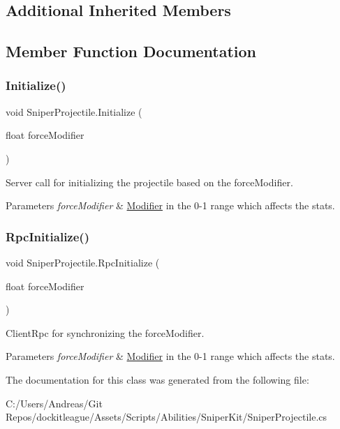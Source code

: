 \subsection*{Additional Inherited Members}


\subsection{Member Function Documentation}
\hypertarget{class_sniper_projectile_af684c23f2980a8cb1305acac888a0413}{}\label{class_sniper_projectile_af684c23f2980a8cb1305acac888a0413} 
\subsubsection{\texorpdfstring{Initialize()}{Initialize()}}
{\footnotesize\ttfamily void Sniper\+Projectile.\+Initialize (\begin{DoxyParamCaption}\item[{float}]{force\+Modifier }\end{DoxyParamCaption})}



Server call for initializing the projectile based on the force\+Modifier. 


\begin{DoxyParams}{Parameters}
{\em force\+Modifier} & \hyperlink{class_modifier}{Modifier} in the 0-\/1 range which affects the stats.\\
\hline
\end{DoxyParams}
\hypertarget{class_sniper_projectile_a0c84fa60ff4f788bb94f6c810ab59570}{}\label{class_sniper_projectile_a0c84fa60ff4f788bb94f6c810ab59570} 
\subsubsection{\texorpdfstring{Rpc\+Initialize()}{RpcInitialize()}}
{\footnotesize\ttfamily void Sniper\+Projectile.\+Rpc\+Initialize (\begin{DoxyParamCaption}\item[{float}]{force\+Modifier }\end{DoxyParamCaption})}



Client\+Rpc for synchronizing the force\+Modifier. 


\begin{DoxyParams}{Parameters}
{\em force\+Modifier} & \hyperlink{class_modifier}{Modifier} in the 0-\/1 range which affects the stats.\\
\hline
\end{DoxyParams}


The documentation for this class was generated from the following file\+:\begin{DoxyCompactItemize}
\item 
C\+:/\+Users/\+Andreas/\+Git Repos/dockitleague/\+Assets/\+Scripts/\+Abilities/\+Sniper\+Kit/Sniper\+Projectile.\+cs\end{DoxyCompactItemize}
